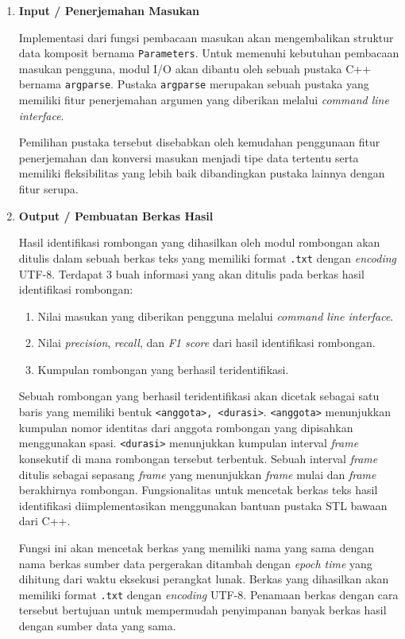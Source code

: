 \begin{enumerate}
    \item \textbf{Input / Penerjemahan Masukan}
    
    Implementasi dari fungsi pembacaan masukan akan mengembalikan struktur data komposit bernama \texttt{Parameters}. Untuk memenuhi kebutuhan pembacaan masukan pengguna, modul I/O akan dibantu oleh sebuah pustaka C++ bernama \texttt{argparse}. Pustaka \texttt{argparse} merupakan sebuah pustaka yang memiliki fitur penerjemahan argumen yang diberikan melalui \textit{command line interface}.
    
    Pemilihan pustaka tersebut disebabkan oleh kemudahan penggunaan fitur penerjemahan dan konversi masukan menjadi tipe data tertentu serta memiliki fleksibilitas yang lebih baik dibandingkan pustaka lainnya dengan fitur serupa. 
    
    \item \textbf{Output / Pembuatan Berkas Hasil}
    
    Hasil identifikasi rombongan yang dihasilkan oleh modul rombongan akan ditulis dalam sebuah berkas teks yang memiliki format \texttt{.txt} dengan \textit{encoding} UTF-8. Terdapat 3 buah informasi yang akan ditulis pada berkas hasil identifikasi rombongan:
    
    \begin{enumerate}
        \item Nilai masukan yang diberikan pengguna melalui \textit{command line interface}.
        
        \item Nilai \textit{precision}, \textit{recall}, dan \textit{F1 score} dari hasil identifikasi rombongan.
        
        \item Kumpulan rombongan yang berhasil teridentifikasi.
    \end{enumerate}
    
    Sebuah rombongan yang berhasil teridentifikasi akan dicetak sebagai satu baris yang memiliki bentuk \texttt{<anggota>, <durasi>}. \texttt{<anggota>} menunjukkan kumpulan nomor identitas dari anggota rombongan yang dipisahkan menggunakan spasi. \texttt{<durasi>} menunjukkan kumpulan interval \textit{frame} konsekutif di mana rombongan tersebut terbentuk. Sebuah interval \textit{frame} ditulis sebagai sepasang \textit{frame} yang menunjukkan \textit{frame} mulai dan \textit{frame} berakhirnya rombongan. Fungsionalitas untuk mencetak berkas teks hasil identifikasi diimplementasikan menggunakan bantuan pustaka STL bawaan dari C++.
    
    Fungsi ini akan mencetak berkas yang memiliki nama yang sama dengan nama berkas sumber data pergerakan ditambah dengan \textit{epoch time} yang dihitung dari waktu eksekusi perangkat lunak. Berkas yang dihasilkan akan memiliki format \texttt{.txt} dengan \textit{encoding} UTF-8. Penamaan berkas dengan cara tersebut bertujuan untuk mempermudah penyimpanan banyak berkas hasil dengan sumber data yang sama. 
\end{enumerate}

